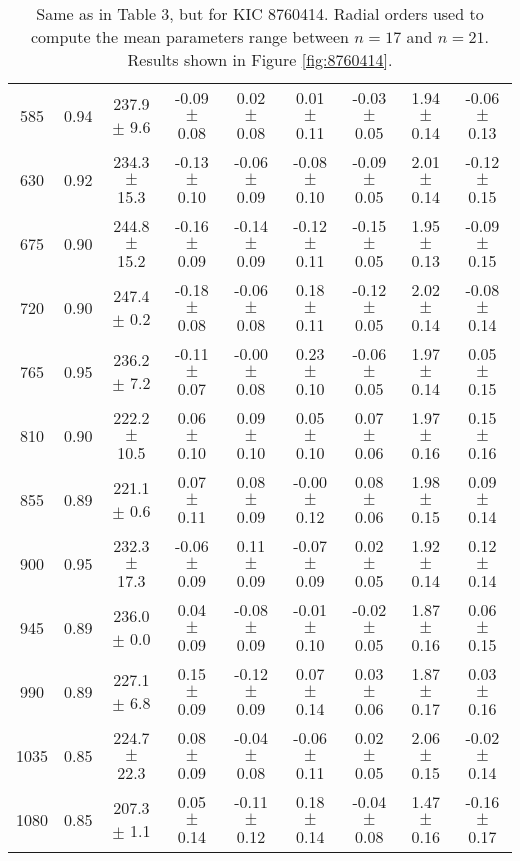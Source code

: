 \documentclass[twocolumn]{aastex61}%
\begin{document}
\begin{table*}[ht]
\begin{tabular}{ccc|ccccc|c}
585 & 0.94 & 237.9 $\pm$ 9.6 & -0.09 $\pm$ 0.08 & 0.02 $\pm$ 0.08 & 0.01 $\pm$ 0.11 & -0.03 $\pm$ 0.05 & 1.94 $\pm$ 0.14 & -0.06 $\pm$ 0.13\\
630 & 0.92 & 234.3 $\pm$ 15.3 & -0.13 $\pm$ 0.10 & -0.06 $\pm$ 0.09 & -0.08 $\pm$ 0.10 & -0.09 $\pm$ 0.05 & 2.01 $\pm$ 0.14 & -0.12 $\pm$ 0.15\\
675 & 0.90 & 244.8 $\pm$ 15.2 & -0.16 $\pm$ 0.09 & -0.14 $\pm$ 0.09 & -0.12 $\pm$ 0.11 & -0.15 $\pm$ 0.05 & 1.95 $\pm$ 0.13 & -0.09 $\pm$ 0.15\\
720 & 0.90 & 247.4 $\pm$ 0.2 & -0.18 $\pm$ 0.08 & -0.06 $\pm$ 0.08 & 0.18 $\pm$ 0.11 & -0.12 $\pm$ 0.05 & 2.02 $\pm$ 0.14 & -0.08 $\pm$ 0.14\\
765 & 0.95 & 236.2 $\pm$ 7.2 & -0.11 $\pm$ 0.07 & -0.00 $\pm$ 0.08 & 0.23 $\pm$ 0.10 & -0.06 $\pm$ 0.05 & 1.97 $\pm$ 0.14 & 0.05 $\pm$ 0.15\\
810 & 0.90 & 222.2 $\pm$ 10.5 & 0.06 $\pm$ 0.10 & 0.09 $\pm$ 0.10 & 0.05 $\pm$ 0.10 & 0.07 $\pm$ 0.06 & 1.97 $\pm$ 0.16 & 0.15 $\pm$ 0.16\\
855 & 0.89 & 221.1 $\pm$ 0.6 & 0.07 $\pm$ 0.11 & 0.08 $\pm$ 0.09 & -0.00 $\pm$ 0.12 & 0.08 $\pm$ 0.06 & 1.98 $\pm$ 0.15 & 0.09 $\pm$ 0.14\\
900 & 0.95 & 232.3 $\pm$ 17.3 & -0.06 $\pm$ 0.09 & 0.11 $\pm$ 0.09 & -0.07 $\pm$ 0.09 & 0.02 $\pm$ 0.05 & 1.92 $\pm$ 0.14 & 0.12 $\pm$ 0.14\\
945 & 0.89 & 236.0 $\pm$ 0.0 & 0.04 $\pm$ 0.09 & -0.08 $\pm$ 0.09 & -0.01 $\pm$ 0.10 & -0.02 $\pm$ 0.05 & 1.87 $\pm$ 0.16 & 0.06 $\pm$ 0.15\\
990 & 0.89 & 227.1 $\pm$ 6.8 & 0.15 $\pm$ 0.09 & -0.12 $\pm$ 0.09 & 0.07 $\pm$ 0.14 & 0.03 $\pm$ 0.06 & 1.87 $\pm$ 0.17 & 0.03 $\pm$ 0.16\\
1035 & 0.85 & 224.7 $\pm$ 22.3 & 0.08 $\pm$ 0.09 & -0.04 $\pm$ 0.08 & -0.06 $\pm$ 0.11 & 0.02 $\pm$ 0.05 & 2.06 $\pm$ 0.15 & -0.02 $\pm$ 0.14\\
1080 & 0.85 & 207.3 $\pm$ 1.1 & 0.05 $\pm$ 0.14 & -0.11 $\pm$ 0.12 & 0.18 $\pm$ 0.14 & -0.04 $\pm$ 0.08 & 1.47 $\pm$ 0.16 & -0.16 $\pm$ 0.17\\
\end{tabular}
\caption{Same as in Table 3, but for KIC 8760414. Radial orders used to compute the mean parameters range between $n=17$ and $n=21$. Results shown in Figure \ref{fig:8760414}.}\label{tab:8760414}\vspace{-1.5cm}
\end{table*}
\end{document}
